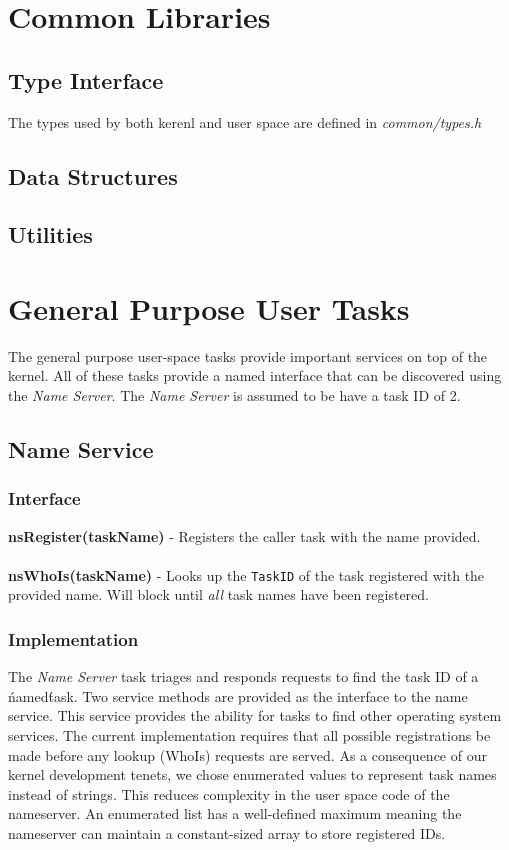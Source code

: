 \documentclass[twoside,a4paper]{refart}
\begin{document}
\section{Common Libraries}
\subsection{Type Interface}
The types used by both kerenl and user space are defined in \textit{common/types.h}
\subsection{Data Structures}
\subsection{Utilities}

\section{General Purpose User Tasks}
The general purpose user-space tasks provide important services on top of the kernel. All of these tasks provide a named interface that can be discovered using the \textit{Name Server}. The \textit{Name Server} is assumed to be have a task ID of 2.

\subsection{Name Service}

\subsubsection{Interface}
\textbf{nsRegister(taskName)} - Registers the caller task with the name provided.\\\\
\textbf{nsWhoIs(taskName)} - Looks up the \verb~TaskID~ of the task registered with the provided name. Will block until \textit{all} task names have been registered.

\subsubsection{Implementation}
The \textit{Name Server} task triages and responds requests to find the task ID of a \'named\' task. Two service methods are provided as the interface to the name service. This service provides the ability for tasks to find other operating system services. The current implementation requires that all possible registrations be made before any lookup (WhoIs) requests are served. As a consequence of our kernel development tenets, we chose enumerated values to represent task names instead of strings. This reduces complexity in the user space code of the nameserver. An enumerated list has a well-defined maximum meaning the nameserver can maintain a constant-sized array to store registered IDs.
\end{document}
